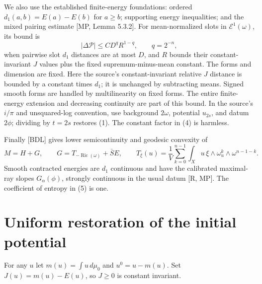 \documentclass[11pt]{article}
\newcommand{\Ric}{\operatorname{Ric}}
\newcommand{\Eone}{\mathcal E^1}
\begin{document}
We also use the established finite-energy foundations: ordered
$d_1(a,b)=E(a)-E(b)$ for $a\geq b$; supporting energy inequalities;
and the mixed pairing estimate [MP, Lemma 5.3.2]. For mean-normalized
slots in $\Eone(\omega)$, its bound is
\[
 |\Delta\mathcal P|\leq C D^q R^{1-q},\qquad q=2^{-n},    \tag{4}
\]
when pairwise slot $d_1$ distances are at most $D$, and $R$ bounds
their constant-invariant $J$ values plus the fixed
supremum-minus-mean constant. The forms and dimension are fixed.
Here the source's constant-invariant relative $J$ distance is bounded
by a constant times $d_1$; it is unchanged by subtracting means.
Signed smooth forms are handled by multilinearity on fixed forms.
The entire finite-energy extension and decreasing continuity are part
of this bound. In the source's $i/\pi$ and unsquared-log convention,
use background $2\omega$, potential $u_{2s}$, and datum $2\phi$;
dividing by $t=2s$ restores (1). The constant factor in (4) is harmless.

Finally [BDL] gives lower semicontinuity and geodesic convexity of
\[
 M=H+G,\qquad
 G=T_{-\Ric(\omega)}+\bar S E,\qquad
 T_\xi(u)=\frac1V\sum_{k=0}^{n-1}
 \int_Xu\,\xi\wedge\omega_u^k\wedge\omega^{n-1-k}.        \tag{5}
\]
Smooth contracted energies are $d_1$ continuous and have the
calibrated maximal-ray slopes $G_\alpha(\phi)$, strongly continuous
in the usual datum [R, MP]. The coefficient of entropy in (5) is one.

\section{Uniform restoration of the initial potential}
For any $u$ let $m(u)=\int u\,d\mu_0$ and $u^0=u-m(u)$.
Set $J(u)=m(u)-E(u)$, so $J\geq0$ is constant invariant.
\end{document}
